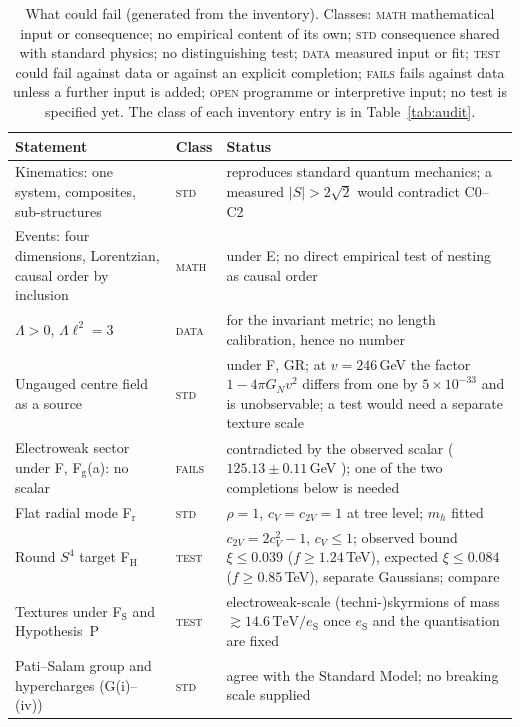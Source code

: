 \documentclass[aps,pra,onecolumn,superscriptaddress,nofootinbib,10pt]{revtex4-2}
\theoremstyle{definition}
\theoremstyle{remark}
\begin{document}
\begin{table}[h]
\caption{What could fail (generated from the inventory).  Classes: \textsc{math} mathematical input or consequence; no empirical content of its own; \textsc{std} consequence shared with standard physics; no distinguishing test; \textsc{data} measured input or fit; \textsc{test} could fail against data or against an explicit completion; \textsc{fails} fails against data unless a further input is added; \textsc{open} programme or interpretive input; no test is specified yet.  The class of each inventory entry is in Table~\ref{tab:audit}.}
\label{tab:falsify}
\footnotesize
\begin{tabular}{@{}p{}p{}p{}@{}}
\toprule
Statement & Class & Status\\
\midrule
{Kinematics: one system, composites, sub-structures} & \textsc{std} & reproduces standard quantum mechanics; a measured $\lvert S\rvert>2\sqrt2$ would contradict C0--C2\\
{Events: four dimensions, Lorentzian, causal order by inclusion} & \textsc{math} & under E; no direct empirical test of nesting as causal order\\
{$\Lambda>0$, $\Lambda\ell^2=3$} & \textsc{data} & for the invariant metric; no length calibration, hence no number\\
{Ungauged centre field as a source} & \textsc{std} & under F, GR; at $v=246$\,GeV the factor $1-4\pi G_Nv^2$ differs from one by $5\times10^{-33}$ and is unobservable; a test would need a separate texture scale\\
{Electroweak sector under F, F$_{\mathrm g}$(a): no scalar} & \textsc{fails} & contradicted by the observed scalar ($125.13\pm0.11$\,GeV \cite{ex-PDG26}); one of the two completions below is needed\\
{Flat radial mode F$_{\mathrm r}$} & \textsc{std} & $\rho=1$, $c_V=c_{2V}=1$ at tree level; $m_h$ fitted\\
{Round $S^4$ target F$_{\mathrm H}$} & \textsc{test} & $c_{2V}=2c_V^2-1$, $c_V\le1$; observed bound $\xi\le0.039$ ($f\ge1.24$\,TeV), expected $\xi\le0.084$ ($f\ge0.85$\,TeV), separate Gaussians; compare \cite{rf:ATLAS2015}\\
{Textures under F$_{\mathrm S}$ and Hypothesis~P} & \textsc{test} & electroweak-scale (techni-)skyrmions of mass $\gtrsim14.6\,\mathrm{TeV}/e_{\mathrm S}$ once $e_{\mathrm S}$ and the quantisation are fixed\\
{Pati--Salam group and hypercharges (G(i)--(iv))} & \textsc{std} & agree with the Standard Model; no breaking scale supplied\\

\end{tabular}
\end{table}
\end{document}
